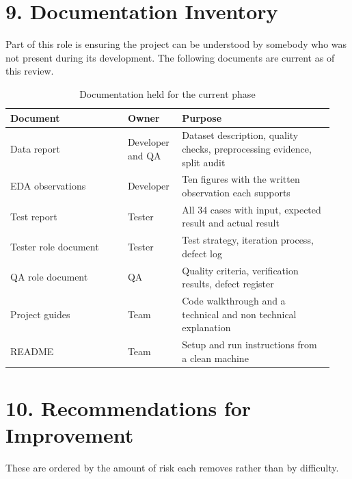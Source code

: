 \documentclass[11pt,a4paper]{article}
\begin{document}
\section{9. Documentation Inventory}
Part of this role is ensuring the project can be understood by somebody who was not present during its development. The following documents are current as of this review.

\begin{table}[!t]
\centering
\caption{Documentation held for the current phase}
\small
\setlength{\tabcolsep}{3pt}
\begin{tabular}{p{0.345\linewidth}p{0.146\linewidth}p{0.449\linewidth}}
\toprule
\textbf{Document} & \textbf{Owner} & \textbf{Purpose} \\
\midrule
Data report & Developer and QA & Dataset description, quality checks, preprocessing evidence, split audit \\
EDA observations & Developer & Ten figures with the written observation each supports \\
Test report & Tester & All 34 cases with input, expected result and actual result \\
Tester role document & Tester & Test strategy, iteration process, defect log \\
QA role document & QA & Quality criteria, verification results, defect register \\
Project guides & Team & Code walkthrough and a technical and non technical explanation \\
README & Team & Setup and run instructions from a clean machine \\
\bottomrule
\end{tabular}
\end{table}

\section{10. Recommendations for Improvement}
These are ordered by the amount of risk each removes rather than by difficulty.
\end{document}
